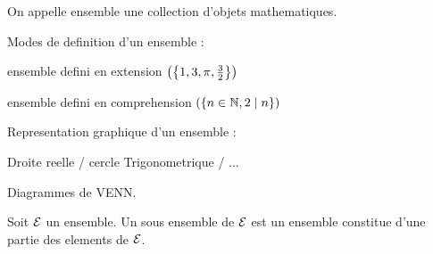 \documentclass[12pt,twoside,a4paper]{article}
\author{MPSI 2}
\begin{document}
	\maketitle
	\begin{defi}
		On appelle ensemble une collection d'objets mathematiques.
		\begin{liste}
			\item Modes de definition d'un ensemble :
				\begin{liste}
					\item ensemble defini en extension			$\left(\left\{1,3,\pi,\frac{3}{2}\right\}\right)$
					\item ensemble defini en comprehension		$\left(\left\{n\in\mathbb{N},2\mid n\right\}\right)$
				\end{liste}
			\item Representation graphique d'un ensemble :
				\begin{liste}
					\item Droite reelle / cercle Trigonometrique / ...
					\item Diagrammes de VENN.
				\end{liste}
			\end{liste}
	\end{defi}
	\begin{defi}
		Soit $\mathcal{E}$ un ensemble. Un sous ensemble de $\mathcal{E}$ est un ensemble constitue d'une partie des elements de $\mathcal{E}$.
	\end{defi}
\end{document}
